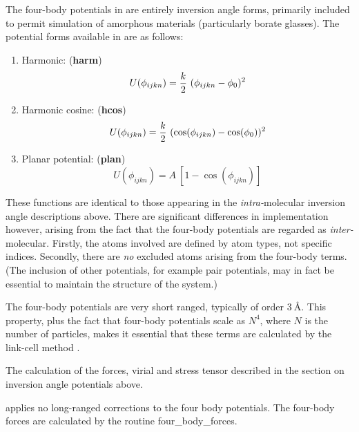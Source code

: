 The four-body potentials in \D are
entirely inversion angle forms,
primarily included to permit simulation of amorphous materials
(particularly borate glasses).  The potential forms available in
\D are as follows:
\begin{enumerate}
\item Harmonic:  ({\bf harm})
\begin{equation}
U(\phi_{ijkn}) = {k \over 2}~(\phi_{ijkn} - \phi_{0})^{2}
\end{equation}
\item Harmonic cosine:  ({\bf hcos})
\begin{equation}
U(\phi_{ijkn}) = {k \over 2}~(\cos(\phi_{ijkn}) - \cos(\phi_{0}))^{2}
\end{equation}
\item Planar potential:  ({\bf plan})
\begin{equation}
U(\phi_{ijkn}) = A~[ 1 - \cos(\phi_{ijkn})]
\end{equation}
\end{enumerate}
These functions are identical to those appearing in the {\em
intra-}molecular inversion angle
descriptions above.  There are significant differences in
implementation however, arising from the fact that the
four-body potentials are regarded as
{\em inter-}molecular.  Firstly, the atoms involved are defined by
atom types, not specific indices.  Secondly, there are {\em no}
excluded atoms arising from the
four-body terms.  (The inclusion of
other potentials, for example pair potentials, may in fact be
essential to maintain the structure of the system.)

The four-body potentials are very short
ranged, typically of order $3~$\AA.  This property, plus the fact
that four-body potentials scale as
$N^{4}$, where $N$ is the number of particles, makes it essential
that these terms are calculated by the link-cell method
\cite{eastwood-80a}.

The calculation of the forces, virial and stress
tensor described in the section on inversion
angle potentials above.

\D applies no long-ranged corrections to the four
body potentials.  The
four-body forces are calculated by the
routine {\sc four\_body\_forces}.

